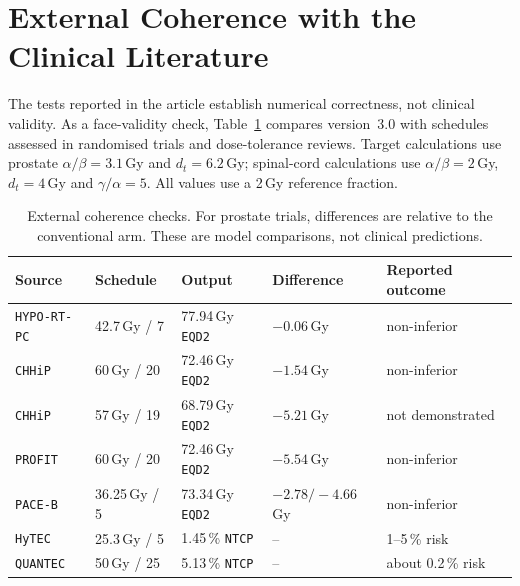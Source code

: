 \documentclass[preprint,12pt,number]{elsarticle}
\begin{document}
\section{External Coherence with the Clinical Literature} \label{app:trials}
The tests reported in the article establish numerical correctness, not clinical validity. As a face-validity check, Table~\ref{tab:clinical} compares version~3.0
with schedules assessed in randomised trials and dose-tolerance reviews. Target calculations use prostate $\alpha/\beta=3.1$\,Gy and $d_t=6.2$\,Gy; spinal-cord
calculations use $\alpha/\beta=2$\,Gy, $d_t=4$\,Gy and $\gamma/\alpha=5$. All values use a 2\,Gy reference fraction.
    \begin{table}
        \centering
        \small
        \caption{External coherence checks. For prostate trials, differences are
        relative to the conventional arm. These are model comparisons, not clinical
        predictions.}
        \label{tab:clinical}
        \begin{tabular}{@{}p{3.0cm}p{2.4cm}p{3.2cm}p{2.8cm}p{3.4cm}@{}}
        \toprule
        Source & Schedule & Output & Difference & Reported outcome \\
        \midrule
        \texttt{HYPO-RT-PC} \cite{widmark2019hypo} & 42.7\,Gy / 7  & 77.94\,Gy \texttt{EQD2} & $-0.06$\,Gy & non-inferior \\
        \texttt{CHHiP} \cite{dearnaley2016chhip}    & 60\,Gy / 20   & 72.46\,Gy \texttt{EQD2} & $-1.54$\,Gy & non-inferior \\
        \texttt{CHHiP} \cite{dearnaley2016chhip}    & 57\,Gy / 19   & 68.79\,Gy \texttt{EQD2} & $-5.21$\,Gy & not demonstrated \\
        \texttt{PROFIT} \cite{catton2017profit}     & 60\,Gy / 20   & 72.46\,Gy \texttt{EQD2} & $-5.54$\,Gy & non-inferior \\
        \texttt{PACE-B} \cite{vanas2024paceb}       & 36.25\,Gy / 5 & 73.34\,Gy \texttt{EQD2} & $-2.78/-4.66$\,Gy & non-inferior \\
        \texttt{HyTEC} \cite{sahgal2021hytec}       & 25.3\,Gy / 5  & 1.45\,\% \texttt{NTCP} & -- & 1--5\,\% risk \\
        \texttt{QUANTEC} \cite{kirkpatrick2010quantec} & 50\,Gy / 25 & 5.13\,\% \texttt{NTCP} & -- & about 0.2\,\% risk \\
        \bottomrule
        \end{tabular}
    \end{table}
\end{document}
